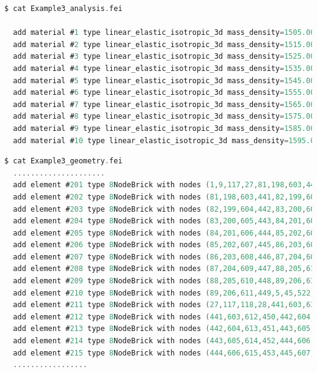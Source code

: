 \documentclass[11pt]{article}
\begin{document}
\begin{lstlisting}[language=C]
$ cat Example3_analysis.fei

  add material #1 type linear_elastic_isotropic_3d mass_density=1505.000000*kg/m^3 elastic_modulus=1904999936.000000*Pa poisson_ratio=0.35;
  add material #2 type linear_elastic_isotropic_3d mass_density=1515.000000*kg/m^3 elastic_modulus=1915000064.000000*Pa poisson_ratio=0.35;
  add material #3 type linear_elastic_isotropic_3d mass_density=1525.000000*kg/m^3 elastic_modulus=1924999936.000000*Pa poisson_ratio=0.35;
  add material #4 type linear_elastic_isotropic_3d mass_density=1535.000000*kg/m^3 elastic_modulus=1935000064.000000*Pa poisson_ratio=0.35;
  add material #5 type linear_elastic_isotropic_3d mass_density=1545.000000*kg/m^3 elastic_modulus=1944999936.000000*Pa poisson_ratio=0.35;
  add material #6 type linear_elastic_isotropic_3d mass_density=1555.000000*kg/m^3 elastic_modulus=1955000064.000000*Pa poisson_ratio=0.35;
  add material #7 type linear_elastic_isotropic_3d mass_density=1565.000000*kg/m^3 elastic_modulus=1964999936.000000*Pa poisson_ratio=0.35;
  add material #8 type linear_elastic_isotropic_3d mass_density=1575.000000*kg/m^3 elastic_modulus=1975000064.000000*Pa poisson_ratio=0.35;
  add material #9 type linear_elastic_isotropic_3d mass_density=1585.000000*kg/m^3 elastic_modulus=1984999936.000000*Pa poisson_ratio=0.35;
  add material #10 type linear_elastic_isotropic_3d mass_density=1595.000000*kg/m^3 elastic_modulus=1995000064.000000*Pa poisson_ratio=0.35;

\end{lstlisting}

\begin{lstlisting}[language=C]
$ cat Example3_geometry.fei
  .....................
  add element #201 type 8NodeBrick with nodes (1,9,117,27,81,198,603,441) use material #1;
  add element #202 type 8NodeBrick with nodes (81,198,603,441,82,199,604,442) use material #2;
  add element #203 type 8NodeBrick with nodes (82,199,604,442,83,200,605,443) use material #3;
  add element #204 type 8NodeBrick with nodes (83,200,605,443,84,201,606,444) use material #4;
  add element #205 type 8NodeBrick with nodes (84,201,606,444,85,202,607,445) use material #5;
  add element #206 type 8NodeBrick with nodes (85,202,607,445,86,203,608,446) use material #6;
  add element #207 type 8NodeBrick with nodes (86,203,608,446,87,204,609,447) use material #7;
  add element #208 type 8NodeBrick with nodes (87,204,609,447,88,205,610,448) use material #8;
  add element #209 type 8NodeBrick with nodes (88,205,610,448,89,206,611,449) use material #9;
  add element #210 type 8NodeBrick with nodes (89,206,611,449,5,45,522,80) use material #10;
  add element #211 type 8NodeBrick with nodes (27,117,118,28,441,603,612,450) use material #1;
  add element #212 type 8NodeBrick with nodes (441,603,612,450,442,604,613,451) use material #2;
  add element #213 type 8NodeBrick with nodes (442,604,613,451,443,605,614,452) use material #3;
  add element #214 type 8NodeBrick with nodes (443,605,614,452,444,606,615,453) use material #4;
  add element #215 type 8NodeBrick with nodes (444,606,615,453,445,607,616,454) use material #5;
  .................
\end{lstlisting}
\end{document}
